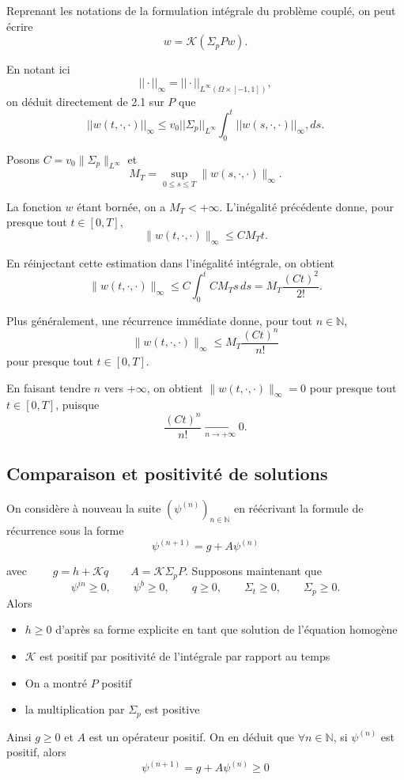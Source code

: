 \documentclass{article}
\begin{document}
Reprenant les notations de la formulation intégrale du problème couplé, on peut écrire
\begin{equation}
    w =\mathcal K(\Sigma_pPw).
\end{equation}

En notant ici
\[
||\cdot||_\infty = ||\cdot||_{L^\infty(\Omega\times[-1,1])},
\]
on déduit directement de 2.1 sur $P$ que
\begin{equation}
    ||w(t,\cdot,\cdot)||_\infty
    \leq v_0||\Sigma_p||_{L^\infty} \int_0^t||w(s,\cdot,\cdot)||_\infty,ds.
\end{equation}

Posons \(C=v_0\|\Sigma_p\|_{L^\infty}\) et
\[
M_T = \sup_{0\leq s\leq T} \|w(s,\cdot,\cdot)\|_\infty.
\]

La fonction $w$ étant bornée, on a $M_T<+\infty$. L'inégalité précédente donne, pour presque tout $t\in[0,T]$,
\[
\|w(t,\cdot,\cdot)\|_\infty
\leq
CM_Tt.
\]

En réinjectant cette estimation dans l'inégalité intégrale, on obtient
\[
\|w(t,\cdot,\cdot)\|_\infty
\leq
C\int_0^tCM_Ts\,ds
=
M_T\frac{(Ct)^2}{2!}.
\]

Plus généralement, une récurrence immédiate donne, pour tout $n\in\mathbb N$,
\[
\|w(t,\cdot,\cdot)\|_\infty \leq M_T\frac{(Ct)^n}{n!}
\]
pour presque tout $t\in[0,T]$.

En faisant tendre $n$ vers $+\infty$, on obtient \(\|w(t,\cdot,\cdot)\|_\infty=0\) pour presque tout $t\in[0,T]$, puisque
\[
\frac{(Ct)^n}{n!}
\xrightarrow[n\to+\infty]{}
0.
\]

\subsection{Comparaison et positivité de solutions}
On considère à nouveau la suite \(\left(\psi^{(n)}\right)_{n\in\mathbb N}\) en réécrivant la formule de récurrence sous la forme
\[\psi^{(n+1)} = g + A\psi^{(n)}\]

avec \( \qquad g = h + \mathcal{K}q \qquad A =\mathcal{K}\Sigma_pP \). Supposons maintenant que 
\[\psi^{in}\ge 0, \qquad \psi^b\ge 0, \qquad q\ge 0, \qquad \Sigma_t\ge 0, \qquad \Sigma_p\ge 0.\]
Alors 
\begin{itemize}
    \item \(h \ge 0\) d'après sa forme explicite en tant que solution de l'équation homogène
    \item $\mathcal{K}$ est positif par positivité de l'intégrale par rapport au temps
    \item On a montré \(P\) positif
    \item la multiplication par \(\Sigma_p\) est positive
\end{itemize}
Ainsi \(g \ge 0\) et \(A\) est un opérateur positif. On en déduit que \(\forall n \in \mathbb{N}\), si \(\psi^{(n)}\) est positif, alors 
\[\psi^{(n+1)} = g + A\psi^{(n)} \ge 0\]
\end{document}
